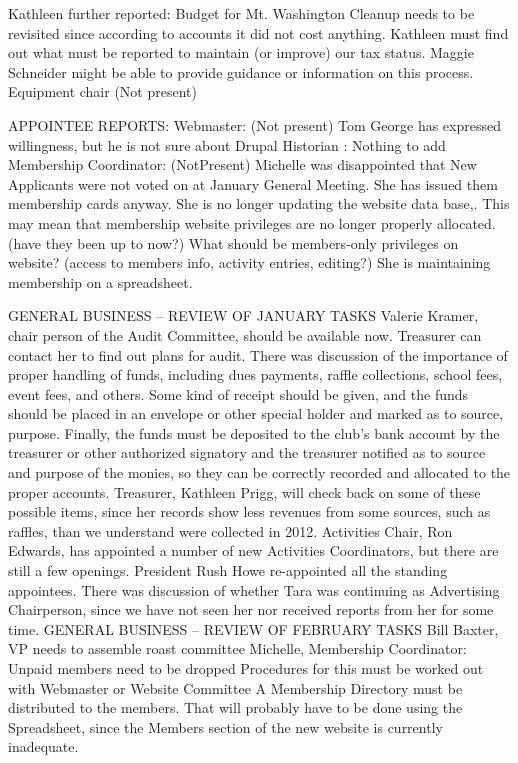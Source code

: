 \documentclass[10pt,a4paper]{article}
\begin{document}
\begin{multicols}{2}
Kathleen further reported:
   Budget for Mt. Washington Cleanup needs to be revisited since according to accounts it did not cost anything.
Kathleen must find out what must be reported to maintain (or improve) our tax status. Maggie Schneider might be able to provide guidance or information on this process.
Equipment chair (Not present)


APPOINTEE REPORTS:
Webmaster: (Not present)
   Tom George has expressed willingness, but he is not sure about Drupal
Historian :
   Nothing to add
Membership Coordinator: (NotPresent)
   Michelle was disappointed that New Applicants were not voted on at January General Meeting.
   She has issued them membership cards anyway.
   She is no longer updating the website data base,.  
      This may mean that membership website privileges are no longer properly allocated.
      (have they been up to now?)
      What should be members-only privileges on website? (access to members info, activity entries, editing?)
  She is maintaining membership on a spreadsheet.

GENERAL BUSINESS – REVIEW OF JANUARY TASKS
Valerie Kramer, chair person of the Audit Committee, should be available now. Treasurer can contact her to find out plans for audit.
    There was discussion of the importance of proper handling of funds, including dues payments, raffle collections, school fees, event fees, and others.  Some kind of receipt should be given, and the funds should be placed in an envelope or other special holder and marked as to source, purpose.  Finally, the funds must be deposited to the club's bank account by the treasurer or other authorized signatory and the treasurer notified  as to source and purpose of the monies, so they can be correctly recorded and allocated to the proper accounts.
Treasurer, Kathleen Prigg, will check back on some of these possible items, since her records show less revenues from some sources, such as raffles, than we understand were collected in 2012.
Activities Chair, Ron Edwards, has appointed a number of new Activities Coordinators, but there are still a few openings.
President Rush Howe re-appointed all the standing appointees.  There was discussion of whether Tara was continuing as Advertising Chairperson, since we have not seen her nor received reports from her for some time.
GENERAL BUSINESS – REVIEW OF FEBRUARY TASKS
Bill Baxter, VP needs to assemble roast committee
Michelle, Membership Coordinator:
   Unpaid members need to be dropped
	Procedures for this must be worked out with Webmaster or Website Committee
   A Membership Directory must be distributed to the members.  That will probably have to be done
   using the Spreadsheet, since the Members section of the new website is currently inadequate.
   


\end{multicols}
\end{document}
